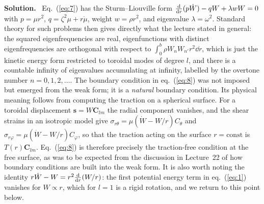 \documentclass[a4paper,12pt]{paper}
\newenvironment{solution}{\par\noindent\textbf{Solution.}\ }{\par\medskip}
\begin{document}
\begin{solution}
Eq.~(\ref{eq:7}) has the Sturm--Liouville form $\frac{\mathrm{d}}{\mathrm{d} r}(p\dot{W})-qW+\lambda wW=0$ with
$p=\mu r^{2}$, $q=\zeta^{2}\mu+r\dot{\mu}$, weight $w=\rho r^{2}$, and eigenvalue
$\lambda=\omega^{2}$. Standard theory for such problems then gives directly what the lecture
stated in general: the squared eigenfrequencies are real, eigenfunctions with distinct
eigenfrequencies are orthogonal with respect to $\int_{0}^{b}\rho W_{n}W_{n'}r^{2}\dd r$, which is
just the kinetic energy form restricted to toroidal modes of degree $l$, and there is a
countable infinity of eigenvalues accumulating at infinity, labelled by the overtone number
$n=0,1,2,\dots$. The boundary condition in eq.~(\ref{eq:8}) was not imposed but emerged from
the weak form; it is a \textit{natural} boundary condition. Its physical meaning follows from
computing the traction on a spherical surface. For a toroidal displacement
$\mathbf{s}=W\mathbf{C}_{lm}$ the radial component vanishes, and the shear strains in an
isotropic model give $\sigma_{r\theta}=\mu(\dot{W}-W/r)C_{\theta}$ and
$\sigma_{r\varphi}=\mu(\dot{W}-W/r)C_{\varphi}$, so that the traction acting on the surface
$r=\mathrm{const}$ is $T(r)\mathbf{C}_{lm}$. Eq.~(\ref{eq:8}) is therefore precisely the
traction-free condition at the free surface, as was to be expected from the discussion in
Lecture~22 of how boundary conditions are built into the weak form. It is also worth noting
the identity $r\dot{W}-W=r^{2}\frac{\mathrm{d}}{\mathrm{d} r}(W/r)$: the first potential energy
term in eq.~(\ref{eq:1}) vanishes for $W\propto r$, which for $l=1$ is a rigid rotation, and
we return to this point below.


\end{solution}
\end{document}
